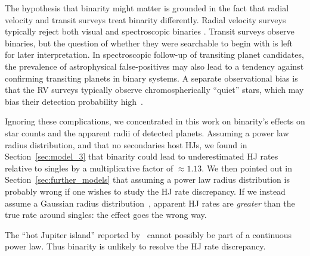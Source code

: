 \documentclass[12pt,modern]{aastex61}
\begin{document}
The hypothesis that binarity might matter is grounded in the fact that
radial velocity and transit surveys treat binarity differently.
Radial velocity surveys typically reject both visual and spectroscopic
binaries \citep[\textit{e.g.},][]{wright_frequency_2012}.  Transit
surveys observe binaries, but the question of whether they were
searchable to begin with is left for later interpretation.  In
spectroscopic follow-up of transiting planet candidates, the
prevalence of astrophysical false-positives may also lead to a
tendency against confirming transiting planets in binary systems.  A
separate observational bias is that the RV surveys typically observe
chromospherically ``quiet'' stars, which may bias their detection
probability high~\citep{bastien_radial_2014}.

Ignoring these complications, we concentrated in this work on
binarity's effects on star counts and the apparent radii of detected
planets.  Assuming a power law radius distribution, and that no
secondaries host HJs, we found in Section~\ref{sec:model_3} that
binarity could lead to underestimated HJ rates relative to singles by
a multiplicative factor of $\approx 1.13$.  We then pointed out in
Section~\ref{sec:further_models} that assuming a power law radius
distribution is probably wrong if one wishes to study the HJ rate
discrepancy.  If we instead assume a Gaussian radius
distribution~\citep[following][]{petigura_CKS_2017}, apparent HJ rates
are {\it greater} than the true rate around singles: the effect goes
the wrong way.

The ``hot Jupiter island'' reported by~\citet{petigura_CKS_2017}
cannot possibly be part of a continuous power law.  Thus binarity is
unlikely to resolve the HJ rate discrepancy.
\end{document}

